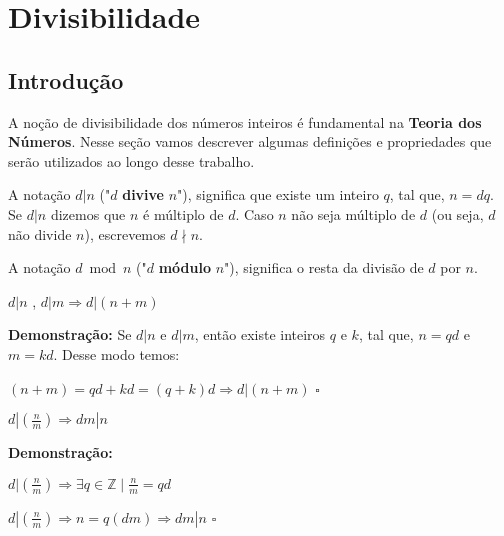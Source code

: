 
\chapter{Divisibilidade} %

\label{Chapter1} %


\section{Introdução}
A noção de divisibilidade dos números inteiros é fundamental na \textbf{Teoria dos Números}.
Nesse seção vamos descrever algumas definições e propriedades que serão utilizados ao longo desse trabalho.

\begin{definition}
A notação $d|n$ ("$d$ \textbf{divive} $n$"), significa que existe um inteiro $q$, tal que, $n = dq$.
Se $d|n$ dizemos que $n$ é múltiplo de $d$. Caso $n$ não seja múltiplo de $d$ (ou seja, $d$ não divide $n$), escrevemos $d \nmid n$.
\end{definition}

\begin{definition}
A notação $d\bmod n$ ("$d$ \textbf{módulo} $n$"), significa o resta da divisão de $d$ por $n$.
\end{definition}

\begin{proposition}\label{divisibilidade_transitiva}
$d|n$ , $d|m \Rightarrow d|(n+m)$
\end{proposition}
\textbf{Demonstração:}
Se $d|n$ e $d|m$, então existe inteiros $q$ e $k$, tal que, $n = qd$ e $m = kd$. Desse modo temos:

$(n+m) = qd + kd = (q + k)d \Rightarrow d|(n+m) $ $\square$


\begin{proposition}\label{divisibilidade_fracao}
$d|(\frac{n}{m}) \Rightarrow dm|n$
\end{proposition}
\textbf{Demonstração:}

$d|(\frac{n}{m}) \Rightarrow \exists q \in \mathbb{Z} \mid \frac{n}{m} = qd$

$d|(\frac{n}{m}) \Rightarrow n = q(dm) \Rightarrow dm|n$ $\square$


